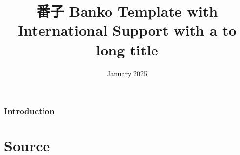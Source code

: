 \documentclass{banko}
\title{番子 Banko Template with International Support with a to long title}
\date{January 2025}
\begin{document}
\maketitle

\romanPage

\tableofcontents

\clearpage
\arabicPage

\newpage

\section{Introduction}

\part{Source}

\printbibliography{}

\sidenotestable
\end{document}
